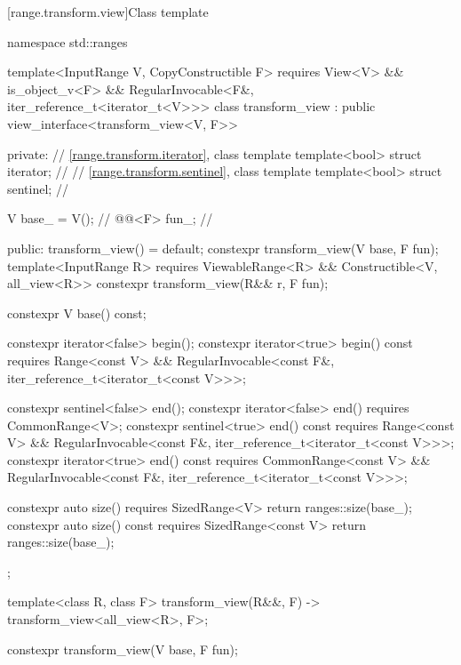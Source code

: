 [range.transform.view]{Class template }

\begin{codeblock}
namespace std::ranges {
  template<InputRange V, CopyConstructible F>
    requires View<V> && is_object_v<F> &&
             RegularInvocable<F&, iter_reference_t<iterator_t<V>>>
  class transform_view : public view_interface<transform_view<V, F>> {
  private:
    // \ref{range.transform.iterator}, class template 
    template<bool> struct iterator;             // \expos
    // \ref{range.transform.sentinel}, class template 
    template<bool> struct sentinel;             // \expos

    V base_ = V();                              // \expos
    @@<F> fun_;                    // \expos

  public:
    transform_view() = default;
    constexpr transform_view(V base, F fun);
    template<InputRange R>
      requires ViewableRange<R> && Constructible<V, all_view<R>>
    constexpr transform_view(R&& r, F fun);

    constexpr V base() const;

    constexpr iterator<false> begin();
    constexpr iterator<true> begin() const
      requires Range<const V> &&
               RegularInvocable<const F&, iter_reference_t<iterator_t<const V>>>;

    constexpr sentinel<false> end();
    constexpr iterator<false> end() requires CommonRange<V>;
    constexpr sentinel<true> end() const
      requires Range<const V> &&
               RegularInvocable<const F&, iter_reference_t<iterator_t<const V>>>;
    constexpr iterator<true> end() const
      requires CommonRange<const V> &&
               RegularInvocable<const F&, iter_reference_t<iterator_t<const V>>>;

    constexpr auto size() requires SizedRange<V> { return ranges::size(base_); }
    constexpr auto size() const requires SizedRange<const V>
    { return ranges::size(base_); }
  };

  template<class R, class F>
    transform_view(R&&, F) -> transform_view<all_view<R>, F>;
}
\end{codeblock}

%
\begin{itemdecl}
constexpr transform_view(V base, F fun);
\end{itemdecl}

